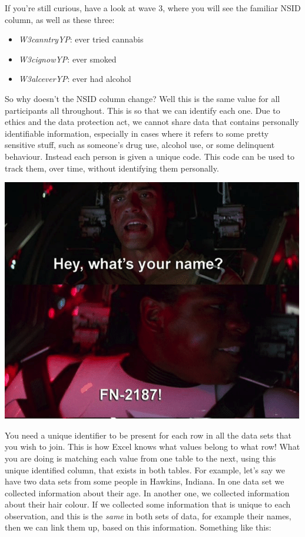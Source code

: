 \documentclass[]{book}
\providecommand{\tightlist}{%
  \setlength{\itemsep}{0pt}\setlength{\parskip}{0pt}}
\theoremstyle{definition}
\theoremstyle{definition}
\theoremstyle{definition}
\theoremstyle{remark}
\begin{document}
If you're still curious, have a look at wave 3, where you will see the
familiar NSID column, as well as these three:

\begin{itemize}
\tightlist
\item
  \emph{W3canntryYP}: ever tried cannabis\\
\item
  \emph{W3cignowYP}: ever smoked
\item
  \emph{W3alceverYP}: ever had alcohol
\end{itemize}

So why doesn't the NSID column change? Well this is the same value for
all participants all throughout. This is so that we can identify each
one. Due to ethics and the data protection act, we cannot share data
that contains personally identifiable information, especially in cases
where it refers to some pretty sensitive stuff, such as someone's drug
use, alcohol use, or some delinquent behaviour. Instead each person is
given a unique code. This code can be used to track them, over time,
without identifying them personally.

\includegraphics{imgs/fn2187.png}

You need a unique identifier to be present for each row in all the data
sets that you wish to join. This is how Excel knows what values belong
to what row! What you are doing is matching each value from one table to
the next, using this unique identified column, that exists in both
tables. For example, let's say we have two data sets from some people in
Hawkins, Indiana. In one data set we collected information about their
age. In another one, we collected information about their hair colour.
If we collected some information that is unique to each observation, and
this is the \emph{same} in both sets of data, for example their names,
then we can link them up, based on this information. Something like
this:
\end{document}
